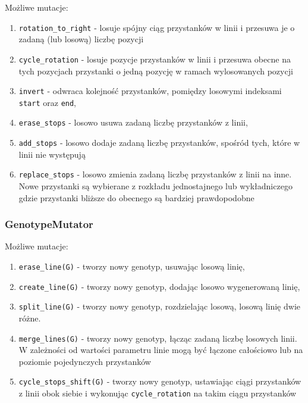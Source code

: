 \documentclass[12pt,a4paper]{article}
\begin{document}
Możliwe mutacje:

\begin{enumerate}
    \item \lstinline{rotation_to_right} - losuje spójny ciąg przystanków w linii i przesuwa je o zadaną (lub losową) liczbę pozycji
    \item \lstinline{cycle_rotation} - losuje pozycje przystanków w linii i przesuwa obecne na tych pozycjach przystanki o jedną pozycję w ramach wylosowanych pozycji
    \item \lstinline{invert} - odwraca kolejność przystanków, pomiędzy losowymi indeksami \lstinline{start} oraz \lstinline{end},
    \item \lstinline{erase_stops} - losowo usuwa zadaną liczbę przystanków z linii,
    \item \lstinline{add_stops} - losowo dodaje zadaną liczbę przystanków, spośród tych, które w linii nie występują
    \item \lstinline{replace_stops} - losowo zmienia zadaną liczbę przystanków z linii na inne. Nowe przystanki są wybierane z rozkładu jednostajnego lub wykładniczego gdzie przystanki bliższe do obecnego są bardziej prawdopodobne
\end{enumerate}

\subsubsection{GenotypeMutator}

Możliwe mutacje:

\begin{enumerate}
    \item \lstinline{erase_line(G)} - tworzy nowy genotyp, usuwając losową linię,
    \item \lstinline{create_line(G)} - tworzy nowy genotyp, dodając losowo wygenerowaną linię,
    \item \lstinline{split_line(G)} - tworzy nowy genotyp, rozdzielając losową, losową linię dwie różne.
    \item \lstinline{merge_lines(G)} - tworzy nowy genotyp, łącząc zadaną liczbę losowych linii. W zależności od wartości parametru linie mogą być łączone całościowo lub na poziomie pojedynczych przystanków
    \item \lstinline{cycle_stops_shift(G)} - tworzy nowy genotyp, ustawiając ciągi przystanków z linii obok siebie i wykonując \lstinline{cycle_rotation} na takim ciągu przystanków
\end{enumerate}
\end{document}
